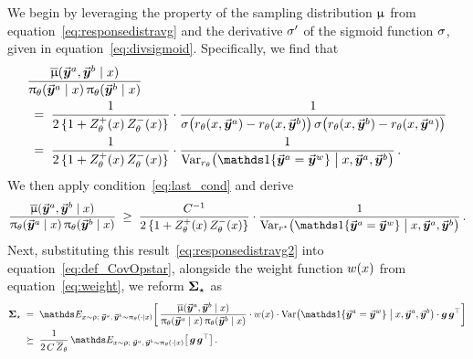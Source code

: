 	We begin by leveraging the property of the sampling distribution $\upmu$ from equation~\eqref{eq:responsedistravg} and the derivative $\sigma'$ of the sigmoid function $\sigma$, given in equation~\eqref{eq:divsigmoid}. Specifically, we find that
	\begin{align*}
		& \frac{\responsedistravg ( \responseone, \responsetwo \mid \prompt )}{\policytheta(\responseone \mid \prompt) \, \policytheta(\responsetwo \mid \prompt)} \notag  \\
		& 
		\; = \; \frac{1}{2 \, \{ 1 + \Partitionthetapos(\prompt) \, \Partitionthetaneg(\prompt) \}}
		\cdot \frac{1}{\sigmoid \big( \rewardtheta(\prompt, \responseone) - \rewardtheta(\prompt, \responsetwo) \big) \, \sigmoid \big( \rewardtheta(\prompt, \responsetwo) - \rewardtheta(\prompt, \responseone) \big)}  \\
        & \; = \; \frac{1}{2 \, \{ 1 + \Partitionthetapos(\prompt) \, \Partitionthetaneg(\prompt) \}}
		\cdot \frac{1}{\Var_{\rewardtheta}\big(\indicator\{\responseone = \responsewin\} \bigm| \prompt, \responseone, \responsetwo \big)} \, .
	\end{align*}
    We then apply condition~\eqref{eq:last_cond} and derive
        \begin{equation} 
		 \frac{\responsedistravg ( \responseone, \responsetwo \mid \prompt )}{\policytheta(\responseone \mid \prompt) \, \policytheta(\responsetwo \mid \prompt)} \; \geq \; \frac{\Const{}^{-1}}{2 \, \{ 1 + \Partitionthetapos(\prompt) \, \Partitionthetaneg(\prompt) \}} \cdot \frac{1}{\Var_{\rewardstar}\big(\indicator\{\responseone = \responsewin\} \bigm| \prompt, \responseone, \responsetwo \big)} \, .
         \label{eq:responsedistravg2}
	\end{equation}
	Next, substituting this result~\eqref{eq:responsedistravg2} into equation~\eqref{eq:def_CovOpstar}, alongside the weight function $w(x)$ from equation~\eqref{eq:weight}, we reform $\boldsymbol{\Sigma}_{\star}$ as
	\begin{align}
		\CovOpstar
		& \; = \; \Exp_{\prompt \sim \promptdistr; \; \responseone, \, \responsetwo \sim \policytheta(\cdot \mid \prompt)}
		\bigg[ \, \frac{\responsedistravg ( \responseone, \responsetwo \mid \prompt )}{\policytheta(\responseone \mid \prompt) \, \policytheta(\responsetwo \mid \prompt)} \cdot \weight(\prompt) \cdot \Var\big(\indicator\{\responseone = \responsewin\} \bigm| \prompt, \responseone, \responsetwo \big) \cdot \grad \, \grad^{\top} \bigg]  \notag \\
		\label{eq:def_CovOpstar_2}
		& \; \succeq \; \frac{1}{2 \, \Const{} \, \Partitionthetabar} \, \Exp_{\prompt \sim \promptdistr; \; \responseone, \, \responsetwo \sim \policytheta(\cdot \mid \prompt)}
		\big[ \, \grad \, \grad^{\top} \big] \, .
	\end{align}
